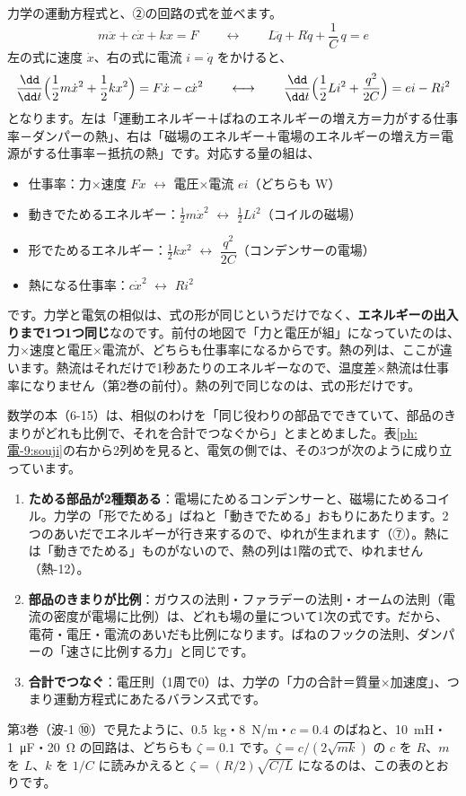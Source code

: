 力学の運動方程式と、②の回路の式を並べます。
\[ m\ddot x+c\dot x+kx=F\qquad\longleftrightarrow\qquad L\ddot q+R\dot q+\frac{1}{C}\,q=e \]
左の式に速度 $\dot x$、右の式に電流 $i=\dot q$ をかけると、
\[ \frac{\dd}{\dd t}\Bigl(\frac12m\dot x^2+\frac12kx^2\Bigr)=F\dot x-c\dot x^2\qquad\longleftrightarrow\qquad\frac{\dd}{\dd t}\Bigl(\frac12Li^2+\frac{q^2}{2C}\Bigr)=ei-Ri^2 \]
となります。左は「運動エネルギー＋ばねのエネルギーの増え方＝力がする仕事率－ダンパーの熱」、右は「磁場のエネルギー＋電場のエネルギーの増え方＝電源がする仕事率－抵抗の熱」です。対応する量の組は、
\begin{itemize}[leftmargin=1.2\zw, itemsep=1pt, topsep=2pt, label={\color{bkTheme}●}]
\item 仕事率：力×速度 $F\dot x$ $\leftrightarrow$ 電圧×電流 $ei$（どちらも W）
\item 動きでためるエネルギー：$\tfrac12m\dot x^2$ $\leftrightarrow$ $\tfrac12Li^2$（コイルの磁場）
\item 形でためるエネルギー：$\tfrac12kx^2$ $\leftrightarrow$ $\dfrac{q^2}{2C}$（コンデンサーの電場）
\item 熱になる仕事率：$c\dot x^2$ $\leftrightarrow$ $Ri^2$
\end{itemize}
です。力学と電気の相似は、式の形が同じというだけでなく、\textbf{エネルギーの出入りまで1つ1つ同じ}なのです。前付の地図で「力と電圧が組」になっていたのは、力×速度と電圧×電流が、どちらも仕事率になるからです。熱の列は、ここが違います。熱流はそれだけで1秒あたりのエネルギーなので、温度差×熱流は仕事率になりません（第2巻の前付）。熱の列で同じなのは、式の形だけです。

数学の本（6-15）は、相似のわけを「同じ役わりの部品でできていて、部品のきまりがどれも比例で、それを合計でつなぐから」とまとめました。表\ref{ph:電-9:souji}の右から2列めを見ると、電気の側では、その3つが次のように成り立っています。
\begin{enumerate}[label={\bkcircled{\arabic*}}, leftmargin=2.4\zw, itemsep=2pt, topsep=2pt]
\item \textbf{ためる部品が2種類ある}：電場にためるコンデンサーと、磁場にためるコイル。力学の「形でためる」ばねと「動きでためる」おもりにあたります。2つのあいだでエネルギーが行き来するので、ゆれが生まれます（⑦）。熱には「動きでためる」ものがないので、熱の列は1階の式で、ゆれません（熱-12）。
\item \textbf{部品のきまりが比例}：ガウスの法則・ファラデーの法則・オームの法則（電流の密度が電場に比例）は、どれも場の量について1次の式です。だから、電荷・電圧・電流のあいだも比例になります。ばねのフックの法則、ダンパーの「速さに比例する力」と同じです。
\item \textbf{合計でつなぐ}：電圧則（1周で0）は、力学の「力の合計＝質量×加速度」、つまり運動方程式にあたるバランス式です。
\end{enumerate}
第3巻（波-1 ⑩）で見たように、\qty{0.5}{kg}・\qty{8}{N/m}・$c=0.4$ のばねと、\qty{10}{mH}・\qty{1}{\micro F}・\qty{20}{\ohm} の回路は、どちらも $\zeta=0.1$ です。$\zeta=c/(2\sqrt{mk})$ の $c$ を $R$、$m$ を $L$、$k$ を $1/C$ に読みかえると $\zeta=(R/2)\sqrt{C/L}$ になるのは、この表のとおりです。

